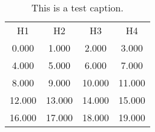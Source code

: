 \begin{table}
\centering
\caption{This is a test caption.}
\begin{tabular}{cccc}
H1 & H2 & H3 & H4\\
0.000 & 1.000 & 2.000 & 3.000\\
4.000 & 5.000 & 6.000 & 7.000\\
8.000 & 9.000 & 10.000 & 11.000\\
12.000 & 13.000 & 14.000 & 15.000\\
16.000 & 17.000 & 18.000 & 19.000\\
\end{tabular}
\end{table}

